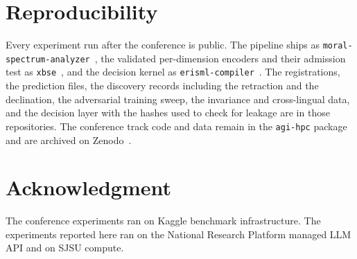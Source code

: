 \documentclass[journal]{IEEEtran}
\begin{document}
\section*{Reproducibility}

Every experiment run after the conference is public. The pipeline ships as
\texttt{moral-spectrum-analyzer}~\cite{msa}, the validated per-dimension
encoders and their admission test as \texttt{xbse}~\cite{xbse}, and the
decision kernel as \texttt{erisml-compiler}~\cite{erisml_compiler}. The
registrations, the prediction files, the discovery records including the
retraction and the declination, the adversarial training sweep, the
invariance and cross-lingual data, and the decision layer with the hashes
used to check for leakage are in those repositories. The conference track
code and data remain in the \texttt{agi-hpc} package and are archived on
Zenodo~\cite{bond2026bds}.

\section*{Acknowledgment}

The conference experiments ran on Kaggle benchmark infrastructure. The
experiments reported here ran on the National Research Platform managed LLM
API and on SJSU compute.
\end{document}
